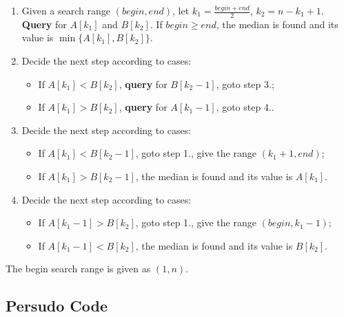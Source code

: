 \documentclass{article}
\newcommand{\bftit}[1]{\noindent\textbf{#1}}
\begin{document}
    \begin{enumerate}
        \item Given a search range $(begin, end)$, let $\displaystyle k_{1} = \frac{begin + end}{2}$, $k_{2} = n - k_{1} + 1$. \textbf{Query} for $A[k_{1}]$ and $B[k_{2}]$. If $begin \ge end$, the median is found and its value is $\min\{A[k_{1}], B[k_{2}]\}$.
        \item Decide the next step according to cases:
        \begin{itemize}
            \item If $A[k_{1}] < B[k_{2}]$, \textbf{query} for $B[k_{2} - 1]$, goto step 3.;
            \item If $A[k_{1}] > B[k_{2}]$, \textbf{query} for $A[k_{1} - 1]$, goto step 4..
        \end{itemize}
        \item Decide the next step according to cases:
        \begin{itemize}
            \item If $A[k_{1}] < B[k_{2} - 1]$, goto step 1., give the range $(k_{1} + 1, end)$;
            \item If $A[k_{1}] > B[k_{2} - 1]$, the median is found and its value is $A[k_{1}]$.
        \end{itemize}
        \item Decide the next step according to cases:
        \begin{itemize}
            \item If $A[k_{1} - 1] > B[k_{2}]$, goto step 1., give the range $(begin, k_{1} - 1)$;
            \item If $A[k_{1} - 1] < B[k_{2}]$, the median is found and its value is $B[k_{2}]$.
        \end{itemize}
    \end{enumerate}

    The begin search range is given as $(1, n)$.

    \newpage

    \subsection{\bftit{Persudo Code}}
\end{document}
